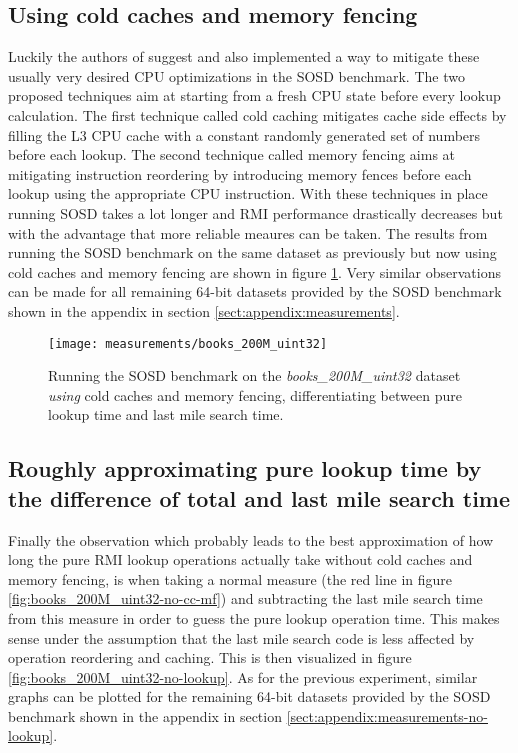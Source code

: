 \subsection{Using cold caches and memory fencing}
Luckily the authors of \cite{sosd-neurips} suggest and also implemented a way to mitigate these usually very desired CPU optimizations in the SOSD benchmark. The two proposed techniques aim at starting from a fresh CPU state before every lookup calculation. The first technique called cold caching mitigates cache side effects by filling the L3 CPU cache with a constant randomly generated set of numbers before each lookup. The second technique called memory fencing aims at mitigating instruction reordering by introducing memory fences before each lookup using the appropriate CPU instruction. With these techniques in place running SOSD takes a lot longer and RMI performance drastically decreases but with the advantage that more reliable meaures can be taken. The results from running the SOSD benchmark on the same dataset as previously but now using cold caches and memory fencing are shown in figure \ref{fig:books_200M_uint32}. Very similar observations can be made for all remaining 64-bit datasets provided by the SOSD benchmark shown in the appendix in section \ref{sect:appendix:measurements}.

\captionsetup[figure]{skip=10pt} %
\begin{figure}[!ht]
  \centering
  \texttt{[image: measurements/books\_200M\_uint32]}
  \caption[Lookup and last mile search time measures \emph{using} cold caches and memory fencing]{
    Running the SOSD benchmark on the \emph{books\_200M\_uint32} dataset \emph{using} cold caches and memory fencing, differentiating between pure lookup time and last mile search time.
  }
  \label{fig:books_200M_uint32}
\end{figure}

\subsection{Roughly approximating pure lookup time by the difference of total and last mile search time}
Finally the observation which probably leads to the best approximation of how long the pure RMI lookup operations actually take without cold caches and memory fencing, is when taking a normal measure (the red line in figure \ref{fig:books_200M_uint32-no-cc-mf}) and subtracting the last mile search time from this measure in order to guess the pure lookup operation time. This makes sense under the assumption that the last mile search code is less affected by operation reordering and caching. This is then visualized in figure \ref{fig:books_200M_uint32-no-lookup}. As for the previous experiment, similar graphs can be plotted for the remaining 64-bit datasets provided by the SOSD benchmark shown in the appendix in section \ref{sect:appendix:measurements-no-lookup}.

